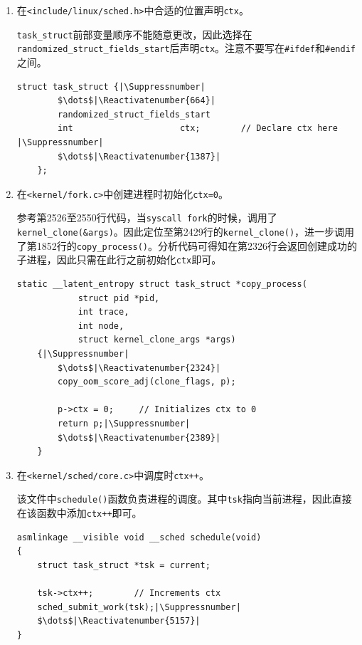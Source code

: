 \documentclass[UTF8]{ctexrep}
\makeatletter
\let\origthelstnumber\thelstnumber
\newcommand*\Suppressnumber{%
  \lst@AddToHook{OnNewLine}{%
    \let\thelstnumber\relax%
     \advance\c@lstnumber-\@ne\relax%
    }%
}
\newcommand*\Reactivatenumber[1]{%
  \setcounter{lstnumber}{\numexpr#1-1\relax}
  \lst@AddToHook{OnNewLine}{%
   \let\thelstnumber\origthelstnumber%
   \refstepcounter{lstnumber}
  }%
}
\makeatother
\begin{document}
    \begin{enumerate}
        \item 在\texttt{<include/linux/sched.h>}中合适的位置声明\texttt{ctx}。

        \texttt{task\_struct}前部变量顺序不能随意更改，因此选择在\texttt{randomized\_struct\_fields\_start}后声明\texttt{ctx}。注意不要写在\texttt{\#ifdef}和\texttt{\#endif}之间。
\begin{lstlisting}[firstnumber=649]
    struct task_struct {|\Suppressnumber|
        $\dots$|\Reactivatenumber{664}|
        randomized_struct_fields_start
        int						ctx;        // Declare ctx here |\Suppressnumber|
        $\dots$|\Reactivatenumber{1387}|
    };
\end{lstlisting}

        \item 在\texttt{<kernel/fork.c>}中创建进程时初始化\texttt{ctx=0}。
        
        参考第2526至2550行代码，当\texttt{syscall fork}的时候，调用了\texttt{kernel\_clone(\&args)}。因此定位至第2429行的\texttt{kernel\_clone()}，进一步调用了第1852行的\texttt{copy\_process()}。分析代码可得知在第2326行会返回创建成功的子进程，因此只需在此行之前初始化\texttt{ctx}即可。

\begin{lstlisting}[firstnumber=1852]
    static __latent_entropy struct task_struct *copy_process(
            struct pid *pid,
            int trace,
            int node,
            struct kernel_clone_args *args)
    {|\Suppressnumber|
        $\dots$|\Reactivatenumber{2324}|
        copy_oom_score_adj(clone_flags, p);

        p->ctx = 0;     // Initializes ctx to 0
        return p;|\Suppressnumber|
        $\dots$|\Reactivatenumber{2389}|
    }
\end{lstlisting}
        
        \item 在\texttt{<kernel/sched/core.c>}中调度时\texttt{ctx++}。
        
        该文件中\texttt{schedule()}函数负责进程的调度。其中\texttt{tsk}指向当前进程，因此直接在该函数中添加\texttt{ctx++}即可。

\begin{lstlisting}[firstnumber=5145]
asmlinkage __visible void __sched schedule(void)
{
    struct task_struct *tsk = current;

    tsk->ctx++;        // Increments ctx
    sched_submit_work(tsk);|\Suppressnumber|
    $\dots$|\Reactivatenumber{5157}|    
}
\end{lstlisting}


\end{enumerate}
\end{document}
